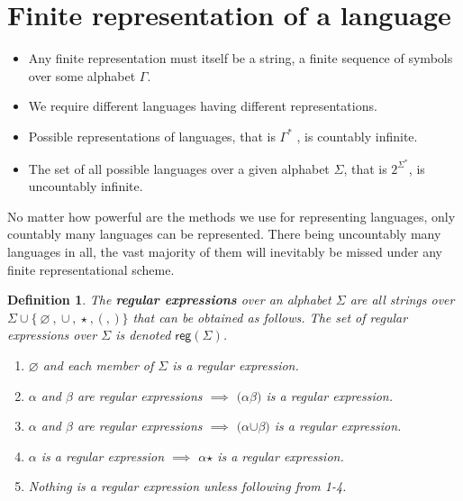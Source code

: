 \documentclass[aps,pra,onecolumn,notitlepage,superscriptaddress]{revtex4-1}
\newcommand{\bs}[1]{\boldsymbol{#1}}
\newcommand{\reg}{\mathsf{reg}}
\newtheorem{defi}{Definition}
\begin{document}
    \section{Finite representation of a language }
    \begin{itemize}
        \item Any finite representation must itself be a string, a finite sequence of symbols over some alphabet $\Gamma$.
        \item We require different languages having different representations.
        \item Possible representations of languages, that is $\Gamma^*$ , is countably infinite.
        \item The set of all possible languages over a given alphabet $\Sigma$, that is $2^{\Sigma^*}$, is uncountably infinite.
    \end{itemize}

    No matter how powerful are the methods we use for representing languages, only countably many languages can be represented. There being uncountably many languages in all, the vast majority of them will inevitably be missed under any finite representational scheme.

    \begin{defi}
        The \textbf{regular expressions} over an alphabet $\Sigma$ are all strings over $\Sigma \cup \{\ 
        \bs \varnothing \ , \ 
        \bs \cup \ , \ 
        \bs \star \ , \ 
        \bs ( \ , \ 
        \bs ) \ \}$ that can be obtained as follows. The set of regular expressions over $\Sigma$ is denoted $\reg(\Sigma)$.
        \begin{enumerate}
            \item $\bs{\varnothing}$ and each member of $\Sigma$ is a regular expression.
            \item $\alpha$ and $\beta$ are regular expressions $\implies$ $\bs{(} \alpha\beta \bs{)}$ is a regular expression.
            \item $\alpha$ and $\beta$ are regular expressions $\implies$ $\bs (\alpha \bs \cup \beta \bs )$ is a regular expression.
            \item $\alpha$ is a regular expression $\implies$ $\alpha \bs\star$ is a regular expression.
            \item Nothing is a regular expression unless following from 1-4.
        \end{enumerate}
    \end{defi}
\end{document}
